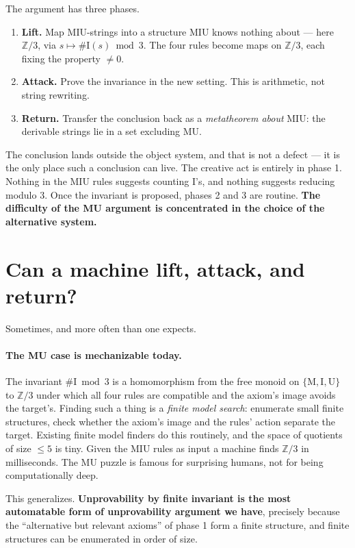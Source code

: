 \documentclass[11pt,a4paper]{article}
\begin{document}
The argument has three phases.

\begin{enumerate}
\item \textbf{Lift.} Map MIU-strings into a structure MIU knows nothing about
--- here $\mathbb{Z}/3$, via $s \mapsto \#\mathrm{I}(s) \bmod 3$. The four
rules become maps on $\mathbb{Z}/3$, each fixing the property $\neq 0$.
\item \textbf{Attack.} Prove the invariance in the new setting. This is
arithmetic, not string rewriting.
\item \textbf{Return.} Transfer the conclusion back as a \emph{metatheorem
about} MIU: the derivable strings lie in a set excluding MU.
\end{enumerate}

The conclusion lands outside the object system, and that is not a defect --- it
is the only place such a conclusion can live. The creative act is entirely in
phase 1. Nothing in the MIU rules suggests counting I's, and nothing suggests
reducing modulo $3$. Once the invariant is proposed, phases 2 and 3 are
routine. \textbf{The difficulty of the MU argument is concentrated in the
choice of the alternative system.}

\section{Can a machine lift, attack, and return?}

Sometimes, and more often than one expects.

\paragraph{The MU case is mechanizable today.} The invariant
$\#\mathrm{I} \bmod 3$ is a homomorphism from the free monoid on
$\{\mathrm{M},\mathrm{I},\mathrm{U}\}$ to $\mathbb{Z}/3$ under which all four
rules are compatible and the axiom's image avoids the target's. Finding such a
thing is a \emph{finite model search}: enumerate small finite structures, check
whether the axiom's image and the rules' action separate the target. Existing
finite model finders do this routinely, and the space of quotients of size
$\le 5$ is tiny. Given the MIU rules as input a machine finds $\mathbb{Z}/3$ in
milliseconds. The MU puzzle is famous for surprising humans, not for being
computationally deep.

This generalizes. \textbf{Unprovability by finite invariant is the most
automatable form of unprovability argument we have}, precisely because the
``alternative but relevant axioms'' of phase 1 form a finite structure, and
finite structures can be enumerated in order of size.
\end{document}
